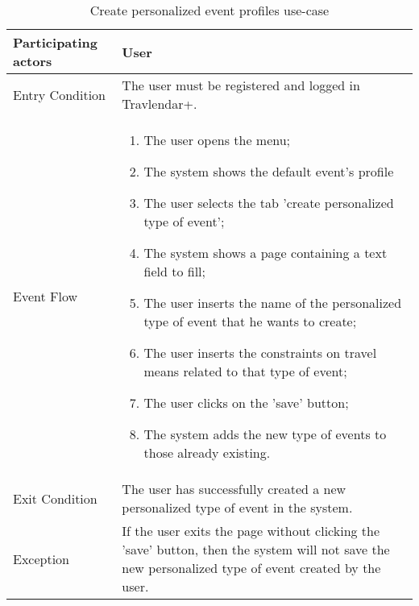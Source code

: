 \begin{table}[H]
	\begin{center}
		\begin{tabular}{ | p{} | p{} | }
		\hline
		Participating actors & User\\
		\hline
		Entry Condition & The user must be registered and logged in Travlendar+.\\
		\hline
		Event Flow & 
			\begin{enumerate}
				\item The user opens the menu;
				\item The system shows the default event's profile
				\item The user selects the tab 'create personalized type of event';
				\item The system shows a page containing a text field to fill;
				\item The user inserts the name of the personalized type of event that he wants to create;
				\item The user inserts the constraints on travel means related to that type of event;
				\item The user clicks on the 'save' button;
				\item The system adds the new type of events to those already existing.

			\end{enumerate} \\
		\hline
		Exit Condition & The user has successfully created a new personalized type of event in the system.\\
		\hline
		Exception & If the user exits the page without clicking the 'save' button, then the system will not save the new personalized type of event created by the user.\\ 
		\hline
		\end{tabular}
	\end{center}
	\caption{Create personalized event profiles use-case}
\end{table}